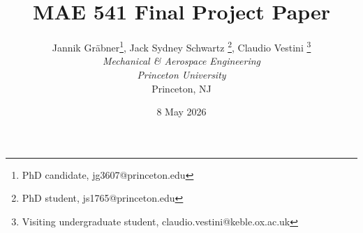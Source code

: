 \documentclass[12pt]{article}
\begin{document}
\title{\huge MAE 541 Final Project Paper}

\author{Jannik Gräbner\footnote{PhD candidate, jg3607@princeton.edu}, Jack Sydney Schwartz \footnote{PhD student, js1765@princeton.edu}, Claudio Vestini \footnote{Visiting undergraduate student, claudio.vestini@keble.ox.ac.uk} \\
\textit{\normalsize Mechanical \& Aerospace Engineering} \\
\textit{\normalsize Princeton University} \\
\normalsize Princeton, NJ}

\date{8 May 2026}

\maketitle


\tableofcontents





\newpage %



\newpage %



\newpage %


\end{document}
